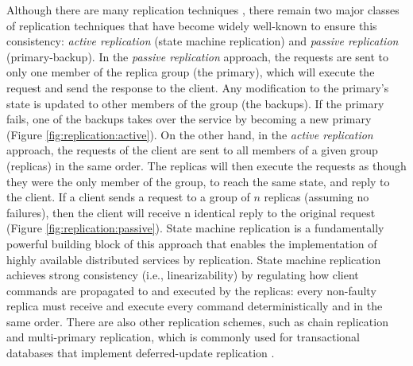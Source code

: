 Although there are many replication techniques \cite{Replication:book}, there
remain two major classes of replication techniques that have become widely
well-known to ensure this consistency: \emph{active replication} (state machine
replication) and \emph{passive replication} (primary-backup).
In the \emph{passive replication} approach, the requests are sent to only one
member of the replica group (the primary), which will execute the request and
send the response to the client. Any modification to the primary's state is
updated to other members of the group (the backups). If the primary fails, one
of the backups takes over the service by becoming a new primary (Figure
\ref{fig:replication:active}). On the other hand, in the \emph{active
replication} approach, the requests of the client are sent to all members of a
given group (replicas) in the same order. The replicas will then execute the
requests as though they were the only member of the group, to reach the same
state, and reply to the client. If a client sends a request to a group of $n$
replicas (assuming no failures), then the client will receive n identical reply
to the original request (Figure \ref{fig:replication:passive}). State machine
replication is a fundamentally powerful building block of this approach that
enables the implementation of highly available distributed services by
replication. State machine replication achieves strong consistency (i.e.,
linearizability) by regulating how client commands are propagated to and
executed by the replicas: every non-faulty replica must receive and execute
every command deterministically and in the same order. There are also other
replication schemes, such as chain replication \cite {chainreplication,
chainreplication:byzantine} and multi-primary replication, which is commonly
used for transactional databases that implement deferred-update replication
\cite{sciascia2012sdur, Replication:book, chundi96dur}.

